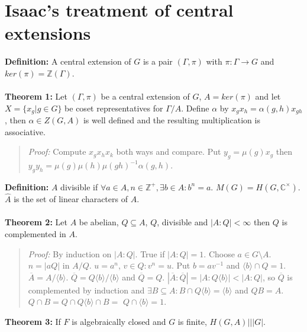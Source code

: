 \section{Isaac's treatment of central extensions}
{\bf Definition:} A central extension of $G$ is a pair $(\Gamma, \pi)$ with $\pi: \Gamma \rightarrow G$ and $ker(\pi) = {\mathbb Z}(\Gamma)$.
\\
\\
{\bf Theorem 1:}
Let $(\Gamma, \pi)$ be a central extension of $G$, $A=ker(\pi)$ and let $X= \{x_g| g \in G \}$ be coset representatives for $\Gamma/A$.
Define $\alpha$ by $x_g x_h = \alpha(g,h) x_{gh}$, then $\alpha \in Z(G,A)$ is well defined and the resulting multiplication is associative.
\begin{quote}
\emph{Proof:} Compute $x_g x_h x_k$ both ways and compare.  Put $y_g = \mu(g)x_g$ then
$y_g y_h = \mu(g) \mu(h) \mu(gh)^{-1} \alpha(g,h)$.
\end{quote}
{\bf Definition:} $A$ divisible if $\forall a \in A, n \in {\mathbb Z}^+, \exists b \in A: b^n=a$.  $M(G)= H(G, {\mathbb C}^{\times})$.
$\hat{A}$ is the set of linear characters of $A$.
\\
\\
{\bf Theorem 2:}
Let $A$ be abelian, $Q \subseteq A$, $Q$, divisible and $|A:Q| < \infty$ then $Q$ is complemented in $A$.
\begin{quote}
\emph{Proof:} By induction on $|A:Q|$.  True if $|A:Q|=1$.  Choose $a \in G \setminus A$. $n=|aQ|$ in $A/Q$.
$u = a^n$, $v \in Q: v^n=u$.  Put $b= av^{-1}$ and $\langle b \rangle \cap Q =1$.  ${\overline A}= A/\langle b \rangle$.
${\overline Q} = Q\langle b \rangle / \langle b \rangle$ and ${\overline Q} = Q$.  
$|{\overline A}:{\overline Q}| = |A:Q\langle b \rangle| < |A:Q|$, so ${\overline Q}$ is complemented by induction and 
$\exists B \subseteq A: B \cap Q\langle b \rangle = \langle b \rangle$ and $QB =A$.  $Q \cap B = Q \cap Q\langle b \rangle \cap B= $
$Q \cap \langle b \rangle = 1$.
\end{quote}
{\bf Theorem 3:}   If $F$ is algebraically closed and $G$ is finite, $H(G,A)| \mid |G|$.
